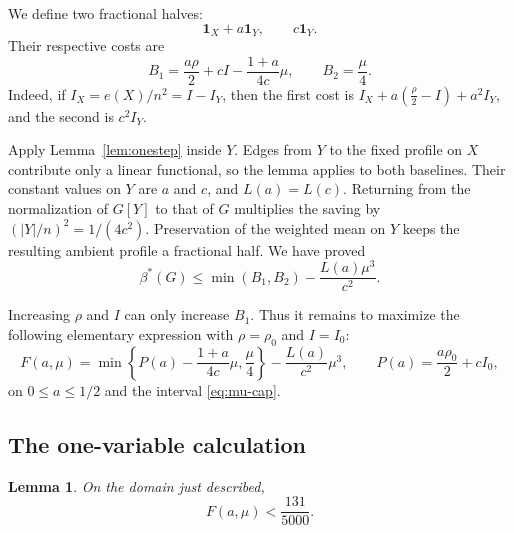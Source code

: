 \documentclass[11pt,reqno]{amsart}
\theoremstyle{plain}
\newtheorem{lemma}[theorem]{Lemma}
\newcommand{\optf}{\beta^{*}}
\newcommand{\dens}{\rho}
\begin{document}
We define two fractional halves:
\[
 \mathbf 1_X+a\mathbf 1_Y,
 \qquad c\mathbf 1_Y.
\]
Their respective costs are
\begin{equation}\label{eq:baselines}
 B_1=\frac{a\dens}{2}+cI-\frac{1+a}{4c}\mu,
 \qquad B_2=\frac\mu4.
\end{equation}
Indeed, if $I_X=e(X)/n^2=I-I_Y$, then the first cost is
$I_X+a(\tfrac{\dens}2-I)+a^2I_Y$, and the second is $c^2I_Y$.

Apply Lemma~\ref{lem:onestep} inside $Y$.  Edges from $Y$ to the fixed
profile on $X$ contribute only a linear functional, so the lemma applies to
both baselines.  Their constant values on $Y$ are $a$ and $c$, and
$L(a)=L(c)$.  Returning from the normalization of $G[Y]$ to that of $G$
multiplies the saving by $(|Y|/n)^2=1/(4c^2)$.  Preservation of the weighted
mean on $Y$ keeps the resulting ambient profile a fractional half.  We have
proved
\begin{equation}\label{eq:master}
 \optf(G)\le\min(B_1,B_2)-\frac{L(a)\mu^3}{c^2}.
\end{equation}

Increasing $\dens$ and $I$ can only increase $B_1$.  Thus it remains to
maximize the following elementary expression with $\dens=\dens_0$ and $I=I_0$:
\begin{equation}\label{eq:F-two}
 F(a,\mu)=
 \min\left\{P(a)-\frac{1+a}{4c}\mu,\frac\mu4\right\}
 -\frac{L(a)}{c^2}\mu^3,
 \qquad
 P(a)=\frac{a\dens_0}{2}+cI_0,
\end{equation}
on $0\le a\le1/2$ and the interval \eqref{eq:mu-cap}.

\subsection{The one-variable calculation}
\begin{lemma}\label{lem:calculus}
On the domain just described,
\[
 F(a,\mu)<\frac{131}{5000}.
\]
\end{lemma}
\end{document}
